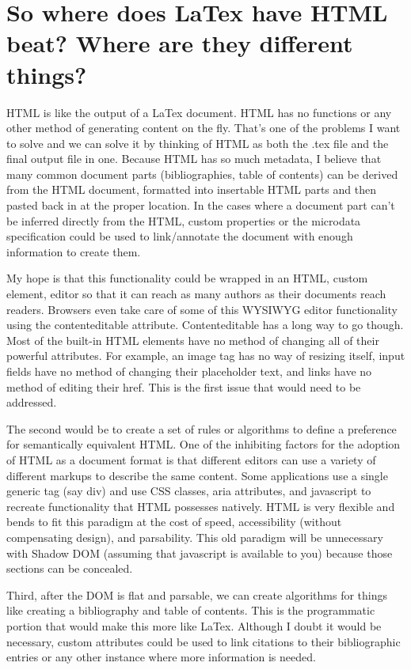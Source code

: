 \documentclass[12pt]{article}
\begin{document}
\section{So where does LaTex have HTML beat?  Where are they different things?}
{
	HTML is like the output of a LaTex document.  HTML has no functions or any other method of generating content on the fly.  That’s one of the problems I want to solve and we can solve it by thinking of HTML as both the .tex file and the final output file in one.  Because HTML has so much metadata, I believe that many common document parts (bibliographies, table of contents) can be derived from the HTML document, formatted into insertable HTML parts and then pasted back in at the proper location.  In the cases where a document part can’t be inferred directly from the HTML, custom properties or the microdata specification could be used to link/annotate the document with enough information to create them.
	
	My hope is that this functionality could be wrapped in an HTML, custom element, editor so that it can reach as many authors as their documents reach readers.  Browsers even take care of some of this  WYSIWYG editor functionality using the contenteditable attribute.  Contenteditable has a long way to go though.  Most of the built-in HTML elements have no method of changing all of their powerful attributes.  For example, an image tag has no way of resizing itself, input fields have no method of changing their placeholder text, and links have no method of editing their href.  This is the first issue that would need to be addressed.
	
	The second would be to create a set of rules or algorithms to define a preference for semantically equivalent HTML.  One of the inhibiting factors for the adoption of HTML as a document format is that different editors can use a variety of different markups to describe the same content.  Some applications use a single generic tag (say div) and use CSS classes, aria attributes, and javascript to recreate functionality that HTML possesses natively.  HTML is very flexible and bends to fit this paradigm at the cost of speed, accessibility (without compensating design), and parsability.  This old paradigm will be unnecessary with Shadow DOM (assuming that javascript is available to you) because those sections can be concealed.
	
	Third, after the DOM is flat and parsable, we can create algorithms for things like creating a bibliography and table of contents.  This is the programmatic portion that would make this more like LaTex.  Although I doubt it would be necessary, custom attributes could be used to link citations to their bibliographic entries or any other instance where more information is needed.

}
\end{document}
